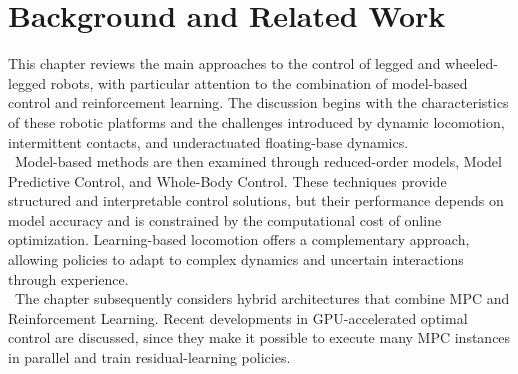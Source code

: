 \chapter{Background and Related Work}
This chapter reviews the main approaches to the control of legged and
wheeled-legged robots, with particular attention to the combination of
model-based control and reinforcement learning. The discussion begins with the
characteristics of these robotic platforms and the challenges introduced by
dynamic locomotion, intermittent contacts, and underactuated floating-base
dynamics.\\
\
Model-based methods are then examined through reduced-order models, Model
Predictive Control, and Whole-Body Control. These techniques provide structured
and interpretable control solutions, but their performance depends on model
accuracy and is constrained by the computational cost of online optimization.
Learning-based locomotion offers a complementary approach, allowing policies to
adapt to complex dynamics and uncertain interactions through experience.\\
\
The chapter subsequently considers hybrid architectures that combine MPC and
Reinforcement Learning. Recent developments in
GPU-accelerated optimal control are discussed, since they make it possible to
execute many MPC instances in parallel and train residual-learning
policies.



\newpage


\newpage



